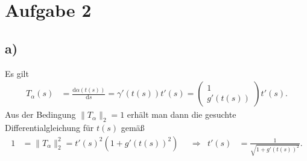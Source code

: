 \documentclass[english, parskip=full]{scrartcl}
\newcommand{\kla}{}
\newcommand{\tecxt}{}
\begin{document}
\section*{Aufgabe 2}
\subsection*{a)}
Es gilt
\begin{align}
T_\alpha(s)&=\frac{\tecxt\text{d}\alpha(t(s))}{\tecxt\text{d}s}=\gamma'(t(s))t'(s)=\begin{pmatrix}
1 \\ g'(t(s))
\end{pmatrix}t'(s).
\end{align}
Aus der Bedingung $\|T_\alpha\|_2=1$ erhält man dann die gesuchte Differentialgleichung für $t(s)$ gemäß
\begin{align}
1&=\|T_\alpha\|_2^2=t'(s)^2\kla\left( 1+g'(t(s))^2 \right)&&\Rightarrow&t'(s)&=\frac{1}{\sqrt{1+g'(t(s))^2}}.
\end{align}
\end{document}
